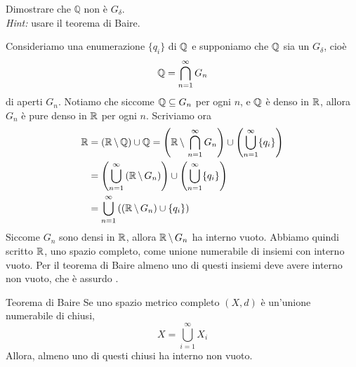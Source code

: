 \documentclass[a4paper]{article}
\begin{document}
\begin{radioactive}
\begin{snippetexercise}{}
    Dimostrare che \(\mathbb{Q}\) non è \(G_\delta\). \\
    \emph{Hint:} usare il teorema di Baire.
\end{snippetexercise}
\end{radioactive}

\begin{radioactive}
\begin{snippetproof}{}
    Consideriamo una enumerazione \(\{q_i\}\) di \(\mathbb{Q}\)
    e supponiamo che \(\mathbb{Q}\) sia un \(G_\delta\), cioè \[
        \mathbb{Q} = \bigcap_{n=1}^\infty G_n
    \]
    di aperti \(G_n\).
    Notiamo che siccome \(\mathbb{Q} \subseteq G_n\) per ogni \(n\),
    e \(\mathbb{Q}\) è denso in \(\mathbb{R}\), allora \(G_n\) è pure
    denso in \(\mathbb{R}\) per ogni \(n\).
    Scriviamo ora 
    \begin{align*}
        \mathbb{R} &= (\mathbb{R} \,\backslash\, \mathbb{Q}) \cup \mathbb{Q}
        = \left(\mathbb{R} \,\backslash\, \bigcap_{n=1}^\infty G_n \right) \cup \left(\bigcup_{n=1}^\infty \{q_i\}\right) \\
        &= \left(\bigcup_{n=1}^\infty \left(\mathbb{R} \,\backslash\, G_n\right) \right) \cup \left(\bigcup_{n=1}^\infty \{q_i\}\right) \\
        &= \bigcup_{n=1}^\infty \left(\left(\mathbb{R} \,\backslash\, G_n\right) \cup \{q_i\}\right)
    \end{align*}
    Siccome \(G_n\) sono densi in \(\mathbb{R}\), allora
    \(\mathbb{R} \,\backslash\, G_n\) ha interno vuoto. Abbiamo quindi scritto
    \(\mathbb{R}\), uno spazio completo, come unione numerabile di insiemi con interno vuoto.
    Per il teorema di Baire almeno uno di questi insiemi deve avere interno non vuoto, che è assurdo \lightning.
\end{snippetproof}
\end{radioactive}

\begin{radioactive}
\begin{snippettheorem}{Teorema di Baire}
    Se uno spazio metrico completo \((X, d)\)
    è un'unione numerabile di chiusi,
    \[
        X = \bigcup_{i=1}^\infty X_i
    \]
    Allora, almeno uno di questi chiusi ha interno non vuoto.
\end{snippettheorem}
\end{radioactive}
\end{document}
